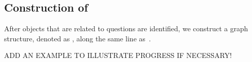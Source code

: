 \subsection{Construction of }
\label{sec-eag-construction}

After objects that are related to questions are identified, we construct a graph structure, denoted as , along the same line as~\cite{peixi2019}. 


\begin{example}
\label{exm-x1}
{\color{red} ADD AN EXAMPLE TO ILLUSTRATE PROGRESS IF NECESSARY!}
\end{example}
